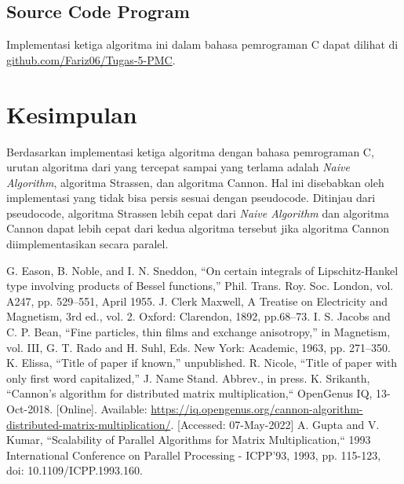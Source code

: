 \documentclass[conference]{IEEEtran}
\begin{document}
\subsection{Source Code Program}
Implementasi ketiga algoritma ini dalam bahasa pemrograman C dapat dilihat di
\href{https://github.com/Fariz06/Tugas-5-PMC}{github.com/Fariz06/Tugas-5-PMC}.

\section{Kesimpulan}
Berdasarkan implementasi ketiga algoritma dengan bahasa pemrograman C,
urutan algoritma dari yang tercepat sampai yang terlama adalah \textit{Naive Algorithm}, algoritma Strassen, dan algoritma Cannon.
Hal ini disebabkan oleh implementasi yang tidak bisa persis sesuai dengan pseudocode.
Ditinjau dari pseudocode, algoritma Strassen lebih cepat dari \textit{Naive Algorithm} dan algoritma Cannon dapat lebih cepat dari kedua algoritma tersebut
jika algoritma Cannon diimplementasikan secara paralel.

\begin{thebibliography}{00}
 G. Eason, B. Noble, and I. N. Sneddon, ``On certain integrals of Lipschitz-Hankel type involving products of Bessel functions,'' Phil. Trans. Roy. Soc. London, vol. A247, pp. 529--551, April 1955.
 J. Clerk Maxwell, A Treatise on Electricity and Magnetism, 3rd ed., vol. 2. Oxford: Clarendon, 1892, pp.68--73.
 I. S. Jacobs and C. P. Bean, ``Fine particles, thin films and exchange anisotropy,'' in Magnetism, vol. III, G. T. Rado and H. Suhl, Eds. New York: Academic, 1963, pp. 271--350.
 K. Elissa, ``Title of paper if known,'' unpublished.
 R. Nicole, ``Title of paper with only first word capitalized,'' J. Name Stand. Abbrev., in press.
 K. Srikanth, ``Cannon's algorithm for distributed matrix multiplication,`` OpenGenus IQ, 13-Oct-2018. [Online]. Available: \href{https://iq.opengenus.org/cannon-algorithm-distributed-matrix-multiplication/}{https://iq.opengenus.org/cannon-algorithm-distributed-matrix-multiplication/}. [Accessed: 07-May-2022] 
 A. Gupta and V. Kumar, ``Scalability of Parallel Algorithms for Matrix Multiplication,`` 1993 International Conference on Parallel Processing - ICPP'93, 1993, pp. 115-123, doi: 10.1109/ICPP.1993.160.
\end{thebibliography}
\end{document}
